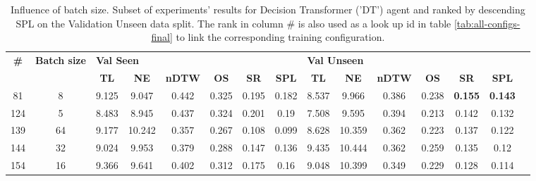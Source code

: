 \begin{table}
\centering
\caption{\label{tab:dt_batch_test}Influence of batch size. Subset of experiments' results for Decision Transformer ('DT') agent and ranked by descending SPL on the Validation Unseen data split. The rank in column \# is also used as a look up id in table \ref{tab:all-configs-final} to link the corresponding training configuration.}
\begin{tabular}{@{\hskip3pt}c@{\hskip3pt}c@{\hskip3pt}c@{\hskip3pt}c@{\hskip3pt}c@{\hskip3pt}c@{\hskip3pt}c@{\hskip3pt}c@{\hskip3pt}c@{\hskip3pt}c@{\hskip3pt}c@{\hskip3pt}c@{\hskip3pt}c@{\hskip3pt}c@{\hskip3pt}c}
\toprule
\textbf{\#} & \textbf{Batch size} & \multicolumn{6}{l}{\textbf{Val Seen}} & \multicolumn{6}{l}{\textbf{Val Unseen}} \\
 \textbf{~} &          \textbf{~} &       \textbf{TL} & \textbf{NE} & \textbf{nDTW} & \textbf{OS} & \textbf{SR} & \textbf{SPL} &         \textbf{TL} & \textbf{NE} & \textbf{nDTW} & \textbf{OS} &     \textbf{SR} &    \textbf{SPL} \\
\midrule
         81 &                   8 &             9.125 &       9.047 &         0.442 &       0.325 &       0.195 &        0.182 &               8.537 &       9.966 &         0.386 &       0.238 &  \textbf{0.155} &  \textbf{0.143} \\
        124 &                   5 &             8.483 &       8.945 &         0.437 &       0.324 &       0.201 &         0.19 &               7.508 &       9.595 &         0.394 &       0.213 &           0.142 &           0.132 \\
        139 &                  64 &             9.177 &      10.242 &         0.357 &       0.267 &       0.108 &        0.099 &               8.628 &      10.359 &         0.362 &       0.223 &           0.137 &           0.122 \\
        144 &                  32 &             9.024 &       9.953 &         0.379 &       0.288 &       0.147 &        0.136 &               9.435 &      10.444 &         0.362 &       0.259 &           0.135 &            0.12 \\
        154 &                  16 &             9.366 &       9.641 &         0.402 &       0.312 &       0.175 &         0.16 &               9.048 &      10.399 &         0.349 &       0.229 &           0.128 &           0.114 \\
\bottomrule
\end{tabular}
\end{table}
